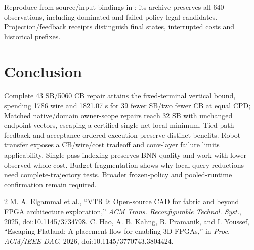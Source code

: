 \documentclass[conference,10pt]{IEEEtran}
\begin{document}
Reproduce from source/input bindings in ; its archive preserves all 640 observations, including dominated and failed-policy legal candidates. Projection/feedback receipts distinguish final states, interrupted costs and historical prefixes.

\section{Conclusion}
Complete 43 SB/5060 CB repair attains the fixed-terminal vertical bound, spending 1786 wire and 1821.07 s for 39 fewer SB/two fewer CB at equal CPD; Matched native/domain owner-scope repairs reach 32 SB with unchanged endpoint vectors, escaping a certified single-net local minimum. Tied-path feedback and acceptance-ordered execution preserve distinct benefits. Robot transfer exposes a CB/wire/cost tradeoff and conv-layer failure limits applicability. Single-pass indexing preserves BNN quality and work with lower observed whole cost. Budget fragmentation shows why local query reductions need complete-trajectory tests. Broader frozen-policy and pooled-runtime confirmation remain required.

\begin{thebibliography}{2}
 M. A. Elgammal et al., ``VTR 9: Open-source CAD for fabric and beyond FPGA architecture exploration,'' \emph{ACM Trans. Reconfigurable Technol. Syst.}, 2025, doi:10.1145/3734798.
 C. Hao, A. B. Kahng, B. Pramanik, and I. Youssef, ``Escaping Flatland: A placement flow for enabling 3D FPGAs,'' in \emph{Proc. ACM/IEEE DAC}, 2026, doi:10.1145/3770743.3804424.
\end{thebibliography}
\end{document}
